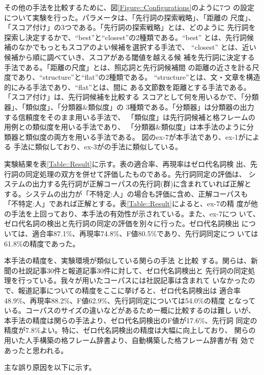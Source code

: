 \documentclass{nlp}
\begin{document}
その他の手法を比較するために、図\ref{Figure::Configurations}のように7つ
の設定について実験を行った。パラメータは、「先行詞の探索戦略」、「距離の
尺度」、「スコア付け」の3つである。「先行詞の探索戦略」とは、どのように
先行詞を探索し決定するかで、``best''と``closest''の2種類である。``best'' 
とは、先行詞候補のなかでもっともスコアのよい候補を選択する手法で、
``closest'' とは、近い候補から順に調べていき、スコアがある閾値を越える候
補を先行詞に決定する手法である。「距離の尺度」とは、照応詞と先行詞候補間
の距離の近さを計る尺度であり、``structure''と``flat''の2種類である。
``structure''とは、文・文章を構造的にみる手法であり、``flat''とは、間に
ある文節数を距離とする手法である。「スコア付け」は、先行詞候補を比較する
スコアとして何を用いるかで、「分類器」、「類似度」、「分類器\&類似度」の
3種類である。「分類器」は分類器の出力する信頼度をそのまま用いる手法で、
「類似度」は先行詞候補と格フレームの用例との類似度を用いる手法であり、
「分類器\&類似度」は本手法のように分類器と類似度の両方を用いる手法である。
図のex-7が本手法であり、ex-1が\cite{Aone1995,Yoshino2001,Ng2002a}による
手法に類似しており、ex-3が\cite{Soon2001,Muller2002}の手法に類似している。

実験結果を表\ref{Table::Result}に示す。表の適合率、再現率はゼロ代名詞検
出、先行詞の同定処理の双方を併せて評価したものである。先行詞同定の評価は、
システムの出力する先行詞が正解コーパスの先行詞(群)に含まれていれば正解と
する。システムの出力が「不特定:人」の場合も評価に含め、正解コーパスも
「不特定:人」であれば正解とする。表\ref{Table::Result}によると、ex-7の精
度が他の手法を上回っており、本手法の有効性が示されている。また、ex-7につ
いて、ゼロ代名詞の検出と先行詞の同定の評価を別々に行った。ゼロ代名詞検出
については、適合率87.1\%、再現率74.8\%、F値80.5\%であり、先行詞同定につ
いては61.8\%の精度であった。

本手法の精度を、実験環境が類似している関らの手法 \cite{Seki2002b}と比較
する。関らは、新聞の社説記事30件と報道記事30件に対して、ゼロ代名詞検出と
先行詞の同定処理を行っている。我々が用いたコーパスには社説記事は含まれて
いなかったので、報道記事についての精度をここに挙げると、ゼロ代名詞検出は
適合率48.9\%、再現率88.2\%、F値62.9\%、先行詞同定については54.0\%の精度
となっている。コーパスのサイズの違いなどがあるため一概に比較するのは難し
いが、本手法の精度は関らの手法より、ゼロ代名詞検出のF値が17.6\%、先行詞
同定の精度が7.8\%よい。特に、ゼロ代名詞検出の精度は大幅に向上しており、
関らの用いた人手構築の格フレーム辞書より、自動構築した格フレーム辞書が有
効であったと思われる。

主な誤り原因を以下に示す。
\end{document}
